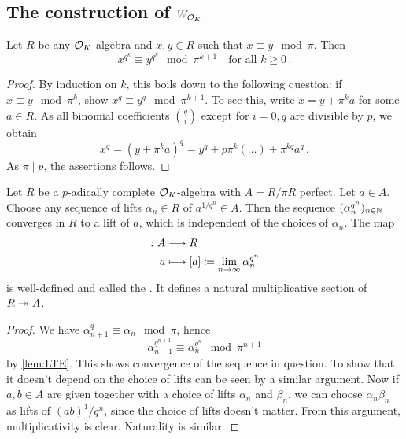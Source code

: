 \documentclass[a4paper, 10pt, oneside, DIV=9, chapterprefix=true, numbers=enddot,bibliography=totoc]{scrbook}
\begin{document}
\subsection{The construction of \texorpdfstring{$W_{\mathcal{O}_K}$}{W}}
\begin{lem}\label{lem:LTE}
	Let $R$ be any $\mathcal{O}_K$-algebra and $x,y\in R$ such that $x\equiv y\mod \pi$. Then
	\begin{equation*}
		x^{q^k}\equiv y^{q^k}\mod \pi^{k+1}\quad\text{for all }k\geq 0\,.
	\end{equation*}
\end{lem}
\begin{proof}
	By induction on $k$, this boils down to the following question: if $x\equiv y\mod \pi^k$, show $x^q\equiv y^q\mod \pi^{k+1}$. To see this, write $x=y+\pi^ka$ for some $a\in R$. As all binomial coefficients $\binom{q}{i}$ except for $i=0,q$ are divisible by $p$, we obtain 
	\begin{equation*}
		x^q=(y+\pi^ka)^q=y^q+p\pi^k(\ldots)+\pi^{kq}a^q\,.
	\end{equation*}
	As $\pi\mid p$, the assertions follows.
\end{proof}
\begin{deflem}
	Let $R$ be a $p$-adically complete $\mathcal{O}_K$-algebra with $A=R/\pi R$ perfect. Let $a\in A$. Choose any sequence of lifts $\alpha_n\in R$ of $a^{1/q^n}\in A$. Then the sequence $(\alpha_n^{q^n})_{n\in \mathbb{N}}$ converges in $R$ to a lift of $a$, which is independent of the choices of $\alpha_n$. The map
	\begin{align*}
		[-]\colon A&\morphism R\\
		a&\longmapsto [a]\coloneqq\lim_{n\to\infty}\alpha_n^{q^n}
	\end{align*}
	is well-defined and called the . It defines a natural multiplicative section of $R\epimorphism A$.
\end{deflem}
\begin{proof}
	We have $\alpha_{n+1}^q\equiv \alpha_n\mod \pi$, hence
	\begin{equation*}
		\alpha_{n+1}^{q^{n+1}}\equiv \alpha_n^{q^n}\mod \pi^{n+1}
	\end{equation*}
	by \cref{lem:LTE}. This shows convergence of the sequence in question. To show that it doesn't depend on the choice of lifts can be seen by a similar argument. Now if $a,b\in A$ are given together with a choice of lifts $\alpha_n$ and $\beta_n$, we can choose $\alpha_n\beta_n$ as lifts of $(ab)^1/q^n$, since the choice of lifts doesn't matter. From this argument, multiplicativity is clear. Naturality is similar.
\end{proof}
\end{document}
